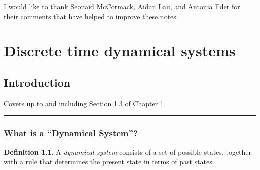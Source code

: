 \documentclass[
  a4paper,
  oneside,
  final]{krantz}
\theoremstyle{definition}
\newtheorem{definition}{Definition}[chapter]
\theoremstyle{definition}
\theoremstyle{definition}
\theoremstyle{definition}
\theoremstyle{remark}
\begin{document}
I would like to thank Seonaid McCormack, Aidan Lau, and Antonia Eder for their comments that have helped to improve these notes.

\hypertarget{part-discrete-time-dynamical-systems}{%
\part{Discrete time dynamical systems}\label{part-discrete-time-dynamical-systems}}

\hypertarget{intro}{%
\chapter{Introduction}\label{intro}}

Covers up to and including Section 1.3 of Chapter 1 \citep{ASY}.

\begin{center}\rule{0.5\linewidth}{0.5pt}\end{center}

\hypertarget{introtodynsys}{%
\section{What is a ``Dynamical System''?}\label{introtodynsys}}

\begin{definition}
\protect\hypertarget{def:dynsys}{}\label{def:dynsys}A \emph{dynamical system} consists of a set of possible states, together with a rule that determines the present state in terms of past states.
\end{definition}
\end{document}
